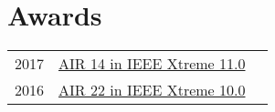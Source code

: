\documentclass[]{deedy-resume-openfont}
\begin{document}
\begin{minipage}[t]{0.66\textwidth}


\section{Awards} 
\begin{tabular}{rll}
2017		& \href{https://drive.google.com/file/d/0B5EALEdIC0ktNFRBOWhNZk4wcTdnY253bnJNQVY0dmZCRkEw/view?usp=sharing}{AIR 14 in IEEE Xtreme 11.0}\\
2016		& \href{https://drive.google.com/file/d/0B5EALEdIC0ktNFRBOWhNZk4wcTdnY253bnJNQVY0dmZCRkEw/view?usp=sharing}{AIR 22 in IEEE Xtreme 10.0}\\

\end{tabular}
\sectionsep


% 
% 

\end{minipage} 
\end{document}
